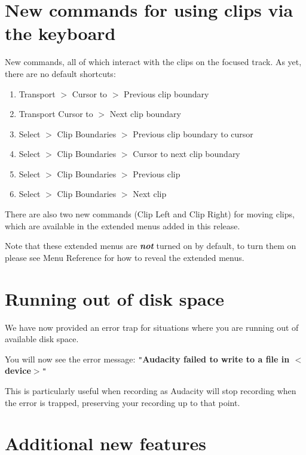 
\section{New commands for using clips via the keyboard}


New commands, all of which interact with the clips on the focused track. As yet, there are no default shortcuts:
\begin{enumerate}
\item Transport \mbox{$>$} Cursor to \mbox{$>$} Previous clip boundary
\item Transport Cursor to \mbox{$>$} Next clip boundary
\item Select \mbox{$>$} Clip Boundaries \mbox{$>$} Previous clip boundary to cursor 
\item Select \mbox{$>$} Clip Boundaries \mbox{$>$} Cursor to next clip boundary 
\item Select \mbox{$>$} Clip Boundaries \mbox{$>$} Previous clip 
\item Select \mbox{$>$} Clip Boundaries \mbox{$>$} Next clip 
\end{enumerate}
There are also two new commands (Clip Left and Clip Right) for moving clips, which are available in the extended menus added in this release.

Note that these extended menus are \textit{\textbf{not}} turned on by default, to turn them on please see Menu Reference for how to reveal the extended menus.



\section{Running out of disk space}


We have now provided an error trap for situations where you are running out of available disk space.

You will now see the error message:
\texttt{{}"{}}\textbf{Audacity failed to write to a file in \mbox{$<$}device\mbox{$>$}}\texttt{{}"{}}

This is particularly useful when recording as Audacity will stop recording when the error is trapped, preserving your recording up to that point.



\section{Additional new features}


